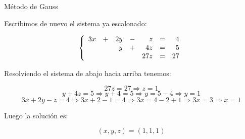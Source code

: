 \documentclass[9pt]{beamer}
\newenvironment{sistematres}{\left\lbrace \begin{array}{rrrrrrr}}{\end{array} \right.}
\begin{document}
\begin{frame}{Método de Gauss}

Escribimos de nuevo el sistema ya escalonado:
\pause

\[ 
	\begin{sistematres}
		3x&+&2y&-&z&=&4 \\
		&&y&+&4z&=&5 \\
		&&&&27z&=&27 \\
	\end{sistematres}
\]

\pause
Resolviendo el sistema de abajo hacia arriba tenemos:

\[ 27z=27 \Rightarrow z=1 \]
\pause
\[ y+4z=5 \Rightarrow y+4=5 \Rightarrow y=5-4 \Rightarrow y=1 \]
\pause
\[ 3x+2y-z=4 \Rightarrow 3x+2-1=4 \Rightarrow 3x=4-2+1 \Rightarrow 3x=3 \Rightarrow x=1 \]
\pause

Luego la solución es:

\[ (x,y,z)=(1,1,1) \] 	
\end{frame}
\end{document}

